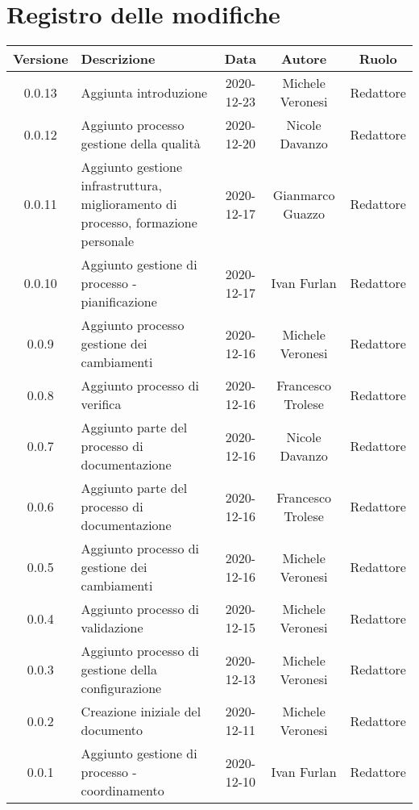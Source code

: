 \section*{Registro delle modifiche}

\begin{center}
	\begin{longtable}{|c|p{5cm}|c|c|c|}
	\hline
	\rowcolor{lighter-grayer}
	\textbf{Versione} & \textbf{Descrizione} & \textbf{Data} & \textbf{Autore} & \textbf{Ruolo} \\
	\hline
	\endfirsthead


	\hline
	0.0.13 & Aggiunta introduzione & 2020-12-23 & Michele Veronesi & Redattore \\
	0.0.12 & Aggiunto processo gestione della qualità & 2020-12-20 & Nicole Davanzo & Redattore \\
	0.0.11 & Aggiunto gestione infrastruttura, miglioramento di processo, formazione personale & 2020-12-17 & Gianmarco Guazzo & Redattore \\
	0.0.10 & Aggiunto gestione di processo - pianificazione & 2020-12-17 & Ivan Furlan & Redattore \\
	0.0.9 & Aggiunto processo gestione dei cambiamenti & 2020-12-16 & Michele Veronesi & Redattore \\
	0.0.8 & Aggiunto processo di verifica & 2020-12-16 & Francesco Trolese & Redattore \\
	0.0.7 & Aggiunto parte del processo di documentazione & 2020-12-16 & Nicole Davanzo & Redattore \\
	0.0.6 & Aggiunto parte del processo di documentazione & 2020-12-16 & Francesco Trolese & Redattore \\
	0.0.5 & Aggiunto processo di gestione dei cambiamenti & 2020-12-16 & Michele Veronesi & Redattore \\
	0.0.4 & Aggiunto processo di validazione & 2020-12-15 & Michele Veronesi & Redattore \\
	0.0.3 & Aggiunto processo di gestione della configurazione & 2020-12-13 & Michele Veronesi & Redattore \\
	0.0.2 & Creazione iniziale del documento & 2020-12-11 & Michele Veronesi & Redattore \\
	0.0.1 & Aggiunto gestione di processo - coordinamento & 2020-12-10 & Ivan Furlan & Redattore \\

	\hline

	\end{longtable}
\end{center}